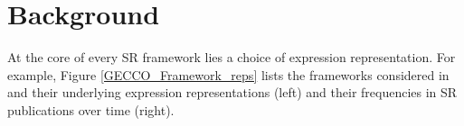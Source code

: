 \documentclass[runningheads]{llncs}
\begin{document}
 

\section{Background}\label{sec:Background}
At the core of every SR framework lies a choice of expression representation. For example, Figure \ref {GECCO_Framework_reps} lists the frameworks considered in \cite{defranca2023interpretable} and their underlying expression representations (left) and their frequencies in SR publications over time (right).

\end{document}
